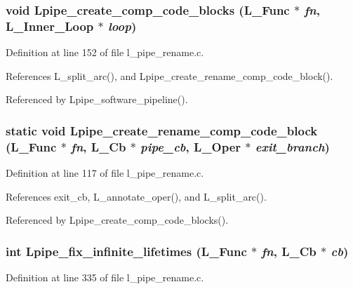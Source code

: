 \subsubsection{\setlength{\rightskip}{0pt plus 5cm}void Lpipe\_\-create\_\-comp\_\-code\_\-blocks (L\_\-Func $\ast$ {\em fn}, L\_\-Inner\_\-Loop $\ast$ {\em loop})}\label{l__pipe__rename_8c_fffde84a48fda4a4a865640c272c2220}




Definition at line 152 of file l\_\-pipe\_\-rename.c.

References L\_\-split\_\-arc(), and Lpipe\_\-create\_\-rename\_\-comp\_\-code\_\-block().

Referenced by Lpipe\_\-software\_\-pipeline().
\subsubsection{\setlength{\rightskip}{0pt plus 5cm}static void Lpipe\_\-create\_\-rename\_\-comp\_\-code\_\-block (L\_\-Func $\ast$ {\em fn}, L\_\-Cb $\ast$ {\em pipe\_\-cb}, L\_\-Oper $\ast$ {\em exit\_\-branch})\hspace{0.3cm}{\tt  [static]}}\label{l__pipe__rename_8c_1b33fd0f1447aaf5a66338f282158a1e}




Definition at line 117 of file l\_\-pipe\_\-rename.c.

References exit\_\-cb, L\_\-annotate\_\-oper(), and L\_\-split\_\-arc().

Referenced by Lpipe\_\-create\_\-comp\_\-code\_\-blocks().
\subsubsection{\setlength{\rightskip}{0pt plus 5cm}int Lpipe\_\-fix\_\-infinite\_\-lifetimes (L\_\-Func $\ast$ {\em fn}, L\_\-Cb $\ast$ {\em cb})}\label{l__pipe__rename_8c_7dc8d4655a2ef52a3198fafa93d3ab1a}




Definition at line 335 of file l\_\-pipe\_\-rename.c.

